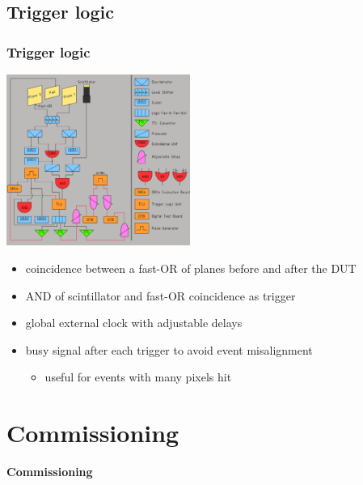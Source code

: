 \documentclass[9pt]{beamer}
\begin{document}
\subsection{Trigger logic}
\begin{frame}
	\frametitle{Trigger logic}
	\begin{center}
		\begin{minipage}{6cm}
			\centering
			\includegraphics[width=6cm]{Pics/triglog2}
		\end{minipage}
		\hspace*{2pt}
		\begin{minipage}{5cm}
			\begin{itemize}
				\item coincidence between a fast-OR of planes before and after the DUT
				\item AND of scintillator and fast-OR coincidence as trigger
				\item global external clock with adjustable delays
				\item busy signal after each trigger to avoid event misalignment
				\begin{itemize}
					\item useful for events with many pixels hit 
				\end{itemize}
			\end{itemize}
		\end{minipage}\no\s
	\end{center}
\end{frame}
\section{Commissioning}
\begin{frame}
	\begin{alertblock}{
		\begin{center}
			\Large{\textbf{Commissioning}}
		\end{center}}
	\end{alertblock}
\end{frame}
\end{document}
